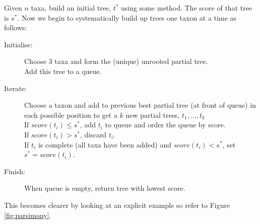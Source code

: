 \documentclass[11pt]{article}
\begin{document}
Given $n$ taxa, build an initial tree, $t^*$ using some method.  The score of that tree is $s^*$.  Now we begin to systematically build up trees one taxon at a time as follows:
\begin{description}
\item[Initialise:]  Choose 3 taxa and form the (unique) unrooted partial tree.\\ Add this tree to a queue.
\item[Iterate:] Choose a taxon and add to previous best partial tree (at front of queue) in each possible position to get a $k$ new partial trees, $t_1,\ldots,t_k$\\
If $score(t_i) \leq s^*$, add $t_i$ to queue and order the queue by score. \\
If $score(t_i) > s^*$, discard  $t_i$. \\
If $t_i$ is complete (all taxa have been added) and $score(t_i) < s^*$, set $s^* = score(t_i)$.
\item[Finish:] When queue is empty, return tree with lowest score.

\end{description}

This becomes clearer by looking at  an explicit example so refer to Figure \ref{fig:parsimony}.

%
%
\end{document}

